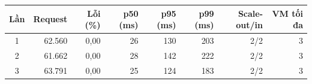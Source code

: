 \begin{tabular}{@{}crrrrrrr@{}}
\toprule
Lần & Request & Lỗi (\%) & p50 (ms) & p95 (ms) & p99 (ms) & Scale-out/in & VM tối đa \\
\midrule
1 & 62.560 & 0,00 & 26 & 130 & 203 & 2/2 & 3 \\
2 & 61.662 & 0,00 & 28 & 142 & 222 & 2/2 & 3 \\
3 & 63.791 & 0,00 & 25 & 124 & 183 & 2/2 & 3 \\
\bottomrule
\end{tabular}